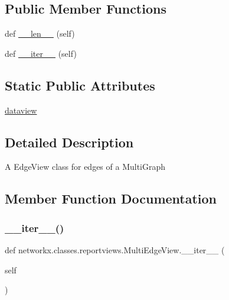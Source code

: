 \subsection*{Public Member Functions}
\begin{DoxyCompactItemize}
\item 
def \hyperlink{classnetworkx_1_1classes_1_1reportviews_1_1MultiEdgeView_ae82ad3349708b4d79ca1027da5f9a5f0}{\+\_\+\+\_\+len\+\_\+\+\_\+} (self)
\item 
def \hyperlink{classnetworkx_1_1classes_1_1reportviews_1_1MultiEdgeView_a5d583e27f7c982e71ade47d5834c05f8}{\+\_\+\+\_\+iter\+\_\+\+\_\+} (self)
\end{DoxyCompactItemize}
\subsection*{Static Public Attributes}
\begin{DoxyCompactItemize}
\item 
\hyperlink{classnetworkx_1_1classes_1_1reportviews_1_1MultiEdgeView_aa3246087297c50a5f74a6f0ec37c52e7}{dataview}
\end{DoxyCompactItemize}


\subsection{Detailed Description}
\begin{DoxyVerb}A EdgeView class for edges of a MultiGraph\end{DoxyVerb}
 

\subsection{Member Function Documentation}
\mbox{\label{classnetworkx_1_1classes_1_1reportviews_1_1MultiEdgeView_a5d583e27f7c982e71ade47d5834c05f8}} 
\subsubsection{\texorpdfstring{\+\_\+\+\_\+iter\+\_\+\+\_\+()}{\_\_iter\_\_()}}
{\footnotesize\ttfamily def networkx.\+classes.\+reportviews.\+Multi\+Edge\+View.\+\_\+\+\_\+iter\+\_\+\+\_\+ (\begin{DoxyParamCaption}\item[{}]{self }\end{DoxyParamCaption})}

